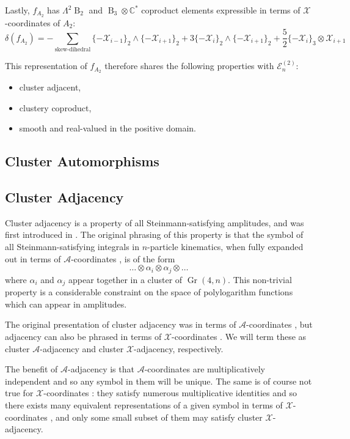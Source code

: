 \documentclass[11pt]{article}
\DeclareMathOperator{\B}{B}
\DeclareMathOperator{\Gr}{Gr}
\def\x{\mathcal{X}}
\def\xcoords{$\mathcal{X}$-coordinates }
\def\a{\mathcal{A}}
\def\acoords{$\mathcal{A}$-coordinates }
\begin{document}
Lastly, $f_{A_2}$ has $\Lambda^2\B_2$ and $\B_3 \otimes \mathbb{C}^*$ coproduct elements expressible in terms of \xcoords of $A_2$:
\begin{equation}
	\delta\left(f_{A_2}\right) = -\sum_{\text{skew-dihedral}} \{-\x_{i-1}\}_2 \wedge \{-\x_{i+1}\}_2 + 3\{-\x_{i}\}_2 \wedge \{-\x_{i+1}\}_2 + \frac{5}{2}\{-\x_{i}\}_3 \otimes \x_{i+1}
\end{equation}

This representation of $f_{A_2}$ therefore shares the following properties with $\mathcal{E}^{(2)}_n$:
\begin{itemize}
	\item cluster adjacent,
	\item clustery coproduct,
	\item smooth and real-valued in the positive domain.
\end{itemize}


\subsection{Cluster Automorphisms}

\subsection{Cluster Adjacency}

Cluster adjacency is a property of all Steinmann-satisfying amplitudes, and was first introduced in \cite{Drummond:2017ssj}. The original phrasing of this property is that the symbol of all Steinmann-satisfying integrals in $n$-particle kinematics, when fully expanded out in terms of \acoords, is of the form 
\begin{equation}
	\ldots \otimes \alpha_i \otimes \alpha_j\otimes \ldots 
\end{equation}
where $\alpha_i$ and $\alpha_j$ appear together in a cluster of $\Gr(4,n)$. This non-trivial property is a considerable constraint on the space of polylogarithm functions which can appear in amplitudes. 

The original presentation of cluster adjacency was in terms of \acoords, but adjacency can also be phrased in terms of \xcoords. We will term these as cluster $\a$-adjacency and cluster $\x$-adjacency, respectively. 

The benefit of $\a$-adjacency is that \acoords are multiplicatively independent and so any symbol in them will be unique. The same is of course not true for \xcoords: they satisfy numerous multiplicative identities and so there exists many equivalent representations of a given symbol in terms of \xcoords, and only some small subset of them may satisfy cluster $\x$- adjacency. 
\end{document}
